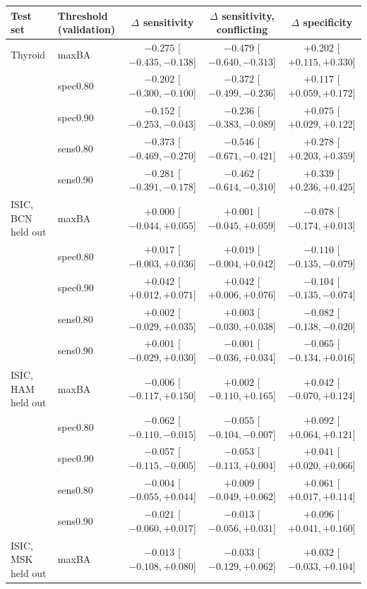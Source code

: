 \begin{center}\scriptsize
\begin{tabular}{llccc}\toprule
Test set & Threshold (validation) & $\Delta$ sensitivity & $\Delta$ sensitivity, conflicting & $\Delta$ specificity \\\midrule
Thyroid & maxBA & $-0.275$ [$-0.435, -0.138$] & $-0.479$ [$-0.640, -0.313$] & $+0.202$ [$+0.115, +0.330$] \\
 & spec0.80 & $-0.202$ [$-0.300, -0.100$] & $-0.372$ [$-0.499, -0.236$] & $+0.117$ [$+0.059, +0.172$] \\
 & spec0.90 & $-0.152$ [$-0.253, -0.043$] & $-0.236$ [$-0.383, -0.089$] & $+0.075$ [$+0.029, +0.122$] \\
 & sens0.80 & $-0.373$ [$-0.469, -0.270$] & $-0.546$ [$-0.671, -0.421$] & $+0.278$ [$+0.203, +0.359$] \\
 & sens0.90 & $-0.281$ [$-0.391, -0.178$] & $-0.462$ [$-0.614, -0.310$] & $+0.339$ [$+0.236, +0.425$] \\
\midrule
ISIC, BCN held out & maxBA & $+0.000$ [$-0.044, +0.055$] & $+0.001$ [$-0.045, +0.059$] & $-0.078$ [$-0.174, +0.013$] \\
 & spec0.80 & $+0.017$ [$-0.003, +0.036$] & $+0.019$ [$-0.004, +0.042$] & $-0.110$ [$-0.135, -0.079$] \\
 & spec0.90 & $+0.042$ [$+0.012, +0.071$] & $+0.042$ [$+0.006, +0.076$] & $-0.104$ [$-0.135, -0.074$] \\
 & sens0.80 & $+0.002$ [$-0.029, +0.035$] & $+0.003$ [$-0.030, +0.038$] & $-0.082$ [$-0.138, -0.020$] \\
 & sens0.90 & $+0.001$ [$-0.029, +0.030$] & $-0.001$ [$-0.036, +0.034$] & $-0.065$ [$-0.134, +0.016$] \\
\midrule
ISIC, HAM held out & maxBA & $-0.006$ [$-0.117, +0.150$] & $+0.002$ [$-0.110, +0.165$] & $+0.042$ [$-0.070, +0.124$] \\
 & spec0.80 & $-0.062$ [$-0.110, -0.015$] & $-0.055$ [$-0.104, -0.007$] & $+0.092$ [$+0.064, +0.121$] \\
 & spec0.90 & $-0.057$ [$-0.115, -0.005$] & $-0.053$ [$-0.113, +0.004$] & $+0.041$ [$+0.020, +0.066$] \\
 & sens0.80 & $-0.004$ [$-0.055, +0.044$] & $+0.009$ [$-0.049, +0.062$] & $+0.061$ [$+0.017, +0.114$] \\
 & sens0.90 & $-0.021$ [$-0.060, +0.017$] & $-0.013$ [$-0.056, +0.031$] & $+0.096$ [$+0.041, +0.160$] \\
\midrule
ISIC, MSK held out & maxBA & $-0.013$ [$-0.108, +0.080$] & $-0.033$ [$-0.129, +0.062$] & $+0.032$ [$-0.033, +0.104$] \\

\end{tabular}
\end{center}
